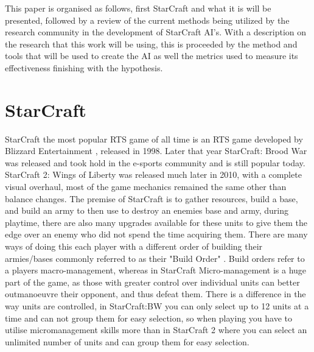 \documentclass[journal]{IEEEtran}
\begin{document}
This paper is organised as follows, first StarCraft and what it is will be presented, followed by a review of the current methods being utilized by the research community in the development of StarCraft AI's. With a description on the research that this work will be using, this is proceeded by the method and tools that will be used to create the AI as well the metrics used to measure its effectiveness finishing with the hypothesis.


\section{StarCraft}
StarCraft the most popular RTS game of all time \cite{Current} is an RTS game developed by Blizzard Entertainment \cite{Blizzard}\cite{Release}, released in 1998. Later that year StarCraft: Brood War was released and took hold in the e-sports community and is still popular today. StarCraft 2: Wings of Liberty was released much later in 2010, with a complete visual overhaul, most of the game mechanics remained the same other than balance changes. The premise of StarCraft is to gather resources, build a base, and build an army to then use to destroy an enemies base and army, during playtime, there are also many upgrades available for these units to give them the edge over an enemy who did not spend the time acquiring them. There are many ways of doing this each player with a different order of building their armies/bases commonly referred to as their "Build Order" \cite{BuildOrder}. Build orders refer to a players macro-management, whereas in StarCraft Micro-management is a huge part of the game, as those with greater control over individual units can better outmanoeuvre their opponent, and thus defeat them. There is a difference in the way units are controlled, in StarCraft:BW you can only select up to 12 units at a time and can not group them for easy selection, so when playing you have to utilise micromanagement skills more than in StarCraft 2 where you can select an unlimited number of units and can group them for easy selection.
\end{document}
